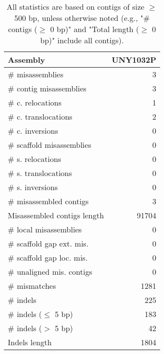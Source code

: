 \documentclass[12pt,a4paper]{article}
\begin{document}
\begin{table}[ht]
\begin{center}
\caption{All statistics are based on contigs of size $\geq$ 500 bp, unless otherwise noted (e.g., "\# contigs ($\geq$ 0 bp)" and "Total length ($\geq$ 0 bp)" include all contigs).}
\begin{tabular}{|l*{1}{|r}|}
\hline
Assembly & UNY1032P \\ \hline
\# misassemblies & 3 \\ \hline
\hspace{2mm}\# contig misassemblies & 3 \\ \hline
\hspace{5mm}\# c. relocations & 1 \\ \hline
\hspace{5mm}\# c. translocations & 2 \\ \hline
\hspace{5mm}\# c. inversions & 0 \\ \hline
\hspace{2mm}\# scaffold misassemblies & 0 \\ \hline
\hspace{5mm}\# s. relocations & 0 \\ \hline
\hspace{5mm}\# s. translocations & 0 \\ \hline
\hspace{5mm}\# s. inversions & 0 \\ \hline
\# misassembled contigs & 3 \\ \hline
Misassembled contigs length & 91704 \\ \hline
\# local misassemblies & 0 \\ \hline
\# scaffold gap ext. mis. & 0 \\ \hline
\# scaffold gap loc. mis. & 0 \\ \hline
\# unaligned mis. contigs & 0 \\ \hline
\# mismatches & 1281 \\ \hline
\# indels & 225 \\ \hline
\hspace{5mm}\# indels ($\leq$ 5 bp) & 183 \\ \hline
\hspace{5mm}\# indels ($>$ 5 bp) & 42 \\ \hline
Indels length & 1804 \\ \hline
\end{tabular}
\end{center}
\end{table}
\end{document}
